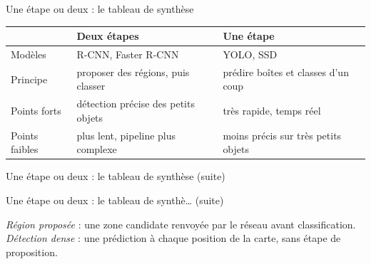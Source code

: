\begin{frame}{Une étape ou deux : le tableau de synthèse}
\begin{center}
\begin{tabular}{@{}p{4.2cm}p{4.7cm}p{4.7cm}@{}}
\toprule
 & \textbf{Deux étapes} & \textbf{Une étape} \\
\midrule
Modèles & R-CNN, Faster R-CNN & YOLO, SSD \\
Principe & proposer des régions, puis classer & prédire boîtes et classes d'un coup \\
Points forts & détection précise des petits objets & très rapide, temps réel \\
Points faibles & plus lent, pipeline plus complexe & moins précis sur très petits objets \\
\bottomrule
\end{tabular}
\end{center}
\vspace{1mm}

\end{frame}
\begin{frame}{Une étape ou deux : le tableau de synthèse (suite)}

\end{frame}
\begin{frame}{Une étape ou deux : le tableau de synthè… (suite)}
\begin{wbox}
\emph{Région proposée} : une zone candidate renvoyée par le réseau avant
classification. \emph{Détection dense} : une prédiction à chaque position de
la carte, sans étape de proposition.
\end{wbox}
\end{frame}

